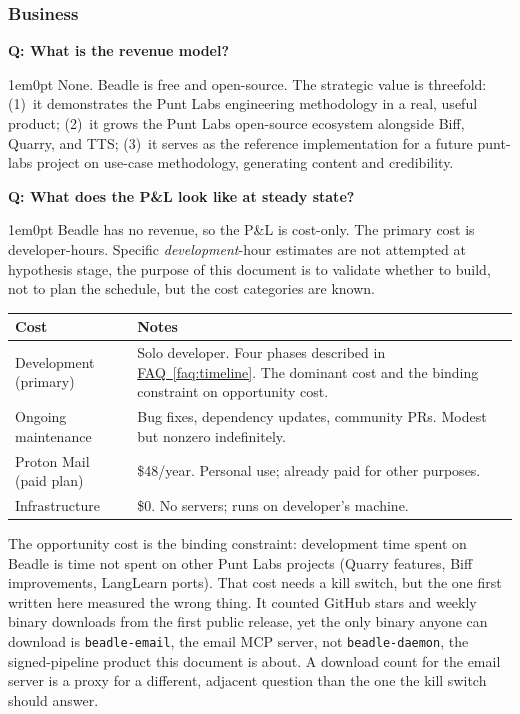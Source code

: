 \documentclass[11pt,letterpaper]{article}
\newcounter{faqnum}
\newenvironment{faqpair}[1]{%
  \needspace{4\baselineskip}%
  \vspace{0.5em}%
  \refstepcounter{faqnum}%
  \noindent\textbf{\color{SectionBlue}Q\thefaqnum: #1}\par\nopagebreak[4]%
  \vspace{0.2em}%
  \begin{adjustwidth}{1em}{0pt}%
  \setlength{\parindent}{0pt}%
}{%
  \end{adjustwidth}%
  \vspace{0.5em}%
}
\newcommand{\faqref}[1]{\hyperref[#1]{FAQ~\ref*{#1}}}
\begin{document}
\subsubsection*{Business}

\begin{faqpair}{What is the revenue model?}\label{faq:revenue}
  None. Beadle is free and open-source. The strategic value is threefold:
  (1)~it demonstrates the Punt Labs engineering methodology in a real,
  useful product; (2)~it grows the Punt Labs open-source ecosystem alongside
  Biff, Quarry, and TTS; (3)~it serves as the reference implementation for
  a future punt-labs project on use-case methodology, generating content and
  credibility.
\end{faqpair}

\begin{faqpair}{What does the P\&L look like at steady state?}\label{faq:pnl}
  Beadle has no revenue, so the P\&L is cost-only. The primary cost is
  developer-hours. Specific \textit{development}-hour estimates are not
  attempted at hypothesis stage, the purpose of this document is to
  validate whether to build,
  not to plan the schedule, but the cost categories are known.

  \begin{tabularx}{\linewidth}{@{} l X @{}}
  \toprule
  \textbf{Cost} & \textbf{Notes} \\
  \midrule
  Development (primary) & Solo developer. Four phases described in
    \faqref{faq:timeline}. The dominant cost and the binding constraint
    on opportunity cost. \\
  Ongoing maintenance & Bug fixes, dependency updates, community PRs.
    Modest but nonzero indefinitely. \\
  Proton Mail (paid plan) & \$48/year. Personal use; already paid for
    other purposes. \\
  Infrastructure & \$0. No servers; runs on developer's machine. \\
  \bottomrule
  \end{tabularx}

  \vspace{0.5em}
  The opportunity cost is the binding constraint: development time spent on
  Beadle is time not spent on other Punt Labs projects (Quarry features, Biff
  improvements, LangLearn ports). That cost needs a kill switch, but the one
  first written here measured the wrong thing. It counted GitHub stars and
  weekly binary downloads from the first public release, yet the only binary
  anyone can download is \texttt{beadle-email}, the email MCP server, not
  \texttt{beadle-daemon}, the signed-pipeline product this document is about.
  A download count for the email server is a proxy for a different, adjacent
  question than the one the kill switch should answer.


\end{faqpair}
\end{document}
